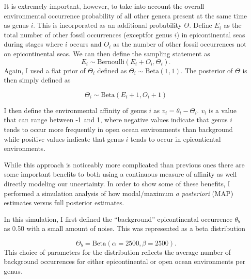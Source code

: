 \documentclass[12pt,letterpaper]{article}
\begin{document}
It is extremely important, however, to take into account the overall environmental occurrence probability of all other genera present at the same time as genus \(i\). This is incorporated as an additional probability \(\Theta\). Define \(E_{i}\) as the total number of other fossil occurrences (exceptfor genus \(i\)) in epicontinental seas during stages where \(i\) occurs and \(O_{i}\) as the number of other fossil occurrences not on epicontinental seas. We can then define the sampling statement as
\begin{equation}
  E_{i} \sim \mathrm{Bernoulli}(E_{i} + O_{i}, \Theta_{i}).
  \label{eq:bck_lik}
\end{equation}
Again, I used a flat prior of \(\Theta_{i}\) defined as \(\Theta_{i} \sim \mathrm{Beta}(1, 1)\). The posterior of \(\Theta\) is then simply defined as

\begin{equation}
  \Theta_{i} \sim \mathrm{Beta}(E_{i} + 1, O_{i} + 1)
  \label{eq:bck_post}
\end{equation}

I then define the environmental affinity of genus \(i\) as \(v_{i} = \theta_{i} - \Theta_{i}\). \(v_{i}\) is a value that can range between -1 and 1, where negative values indicate that genus \(i\) tends to occur more frequently in open ocean environments than background while positive values indicate that genus \(i\) tends to occur in epicontiental environments.

While this approach is noticeably more complicated than previous ones \citep{Foote2006,Miller2001,Simpson2009,Kiessling2007a} there are some important benefits to both using a continuous measure of affinity as well directly modeling our uncertainty. In order to show some of these benefits, I performed a simulation analysis of how modal/maximum \textit{a posteriori} (MAP) estimates versus full posterior estimates.

In this simulation, I first defined the ``background'' epicontinental occurrence \(\theta_{b}\) as 0.50 with a small amount of noise. This was represented as a beta distribution 

\begin{equation}
  \Theta_{b} = \mathrm{Beta}(\alpha = 2500, \beta = 2500). 
  \label{eq:bck_sim}
\end{equation}
This choice of parameters for the distribution reflects the average number of background occurrences for either epicontinental or open ocean environments per genus.
\end{document}
